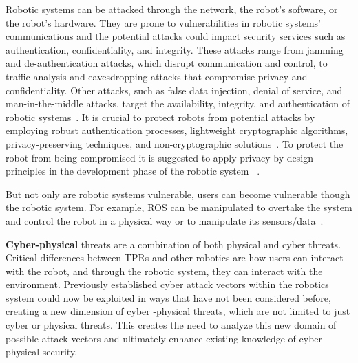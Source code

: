Robotic systems can be attacked through the network, the robot's software, or the robot's hardware. They are prone to vulnerabilities in
robotic
systems'
communications and the potential attacks could impact security services such as authentication, confidentiality, and
integrity. These attacks range from jamming and de-authentication attacks, which disrupt communication and control, to traffic analysis
and eavesdropping attacks that compromise privacy and confidentiality. Other attacks, such as false data injection, denial of service,
and man-in-the-middle attacks, target the availability, integrity, and authentication of robotic systems~\cite[126-128]{
  robotics_cyber_security_2022}. It is crucial to protect robots from potential attacks by employing robust authentication processes,
lightweight cryptographic algorithms, privacy-preserving techniques, and non-cryptographic solutions~\cite[147-149]{
  robotics_cyber_security_2022}. To protect the robot from being compromised it is suggested to apply privacy by design principles in the
development phase of the robotic system ~\cite[]{smart_design_engineering_2020,role_of_security_in_human_robot_2017, robotics_cyber_security_2022}.

But not only are robotic systems vulnerable, users can become vulnerable though the robotic system. For example, \ac{ROS} can be manipulated to overtake the system and control the robot in a physical way or to manipulate its sensors/data~\cite[]{role_of_security_in_human_robot_2017}.


\textbf{Cyber-physical} threats are a combination of both physical and cyber threats.
Critical differences between TPRs and other robotics are how users can interact with the robot, and through the robotic system,
they can interact with the environment. Previously established cyber attack
vectors within the robotics system could now be exploited in ways that have not been considered before, creating a new dimension of cyber
-physical threats, which are not limited to just cyber or physical threats. This creates the need to analyze this new domain of
possible attack vectors and ultimately enhance existing knowledge of cyber-physical security.


